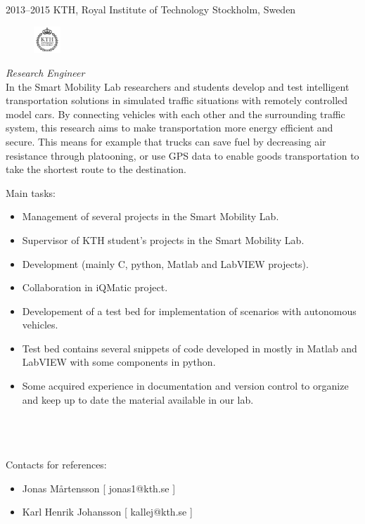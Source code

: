 \documentclass[]{friggeri-cv} %
\begin{document}
\begin{entrylist}
\entry
{2013--2015}
{KTH, Royal Institute of Technology}
{Stockholm, Sweden}
{
\begin{figure}
	\vspace{-20pt}
	\begin{center}
		\includegraphics[width=1cm,height=1cm]{kth}
	\end{center}
\end{figure}
\emph{Research Engineer} \\

In the Smart Mobility Lab researchers and students develop and test intelligent transportation solutions in simulated traffic situations with remotely controlled model cars. By connecting vehicles with each other and the surrounding traffic system, this research aims to make transportation more energy efficient and secure. This means for example that trucks can save fuel by decreasing air resistance through platooning, or use GPS data to enable goods transportation to take the shortest route to the destination.

Main tasks:
\begin{itemize}
	\item Management of several projects in the Smart Mobility Lab.
	\item Supervisor of KTH student's projects in the Smart Mobility Lab.
	\item Development (mainly C, python, Matlab and LabVIEW projects).
	\item Collaboration in iQMatic project.
	\item Developement of a test bed for implementation of scenarios with autonomous vehicles.
	\item Test bed contains several snippets of code developed in mostly in Matlab and LabVIEW with some components in python.
	\item Some acquired experience in documentation and version control to organize and keep up to date the material available in our lab.
\end{itemize}
\\ \\
\\Contacts for references: 
\begin{itemize}
	\item Jonas Mårtensson [ jonas1@kth.se ]
	\item Karl Henrik Johansson [ kallej@kth.se ]
\end{itemize}
}

\end{entrylist}
\end{document}
